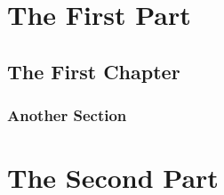 \documentclass[12pt,a4paper,titlepage]{memoir}
\begin{document}
\part{The First Part} %
\chapter{The First Chapter}
\section{Another Section}
\part{The Second Part} %




\appendix{}%


\clearforchapter{}
\printindex{}%
\end{document}
